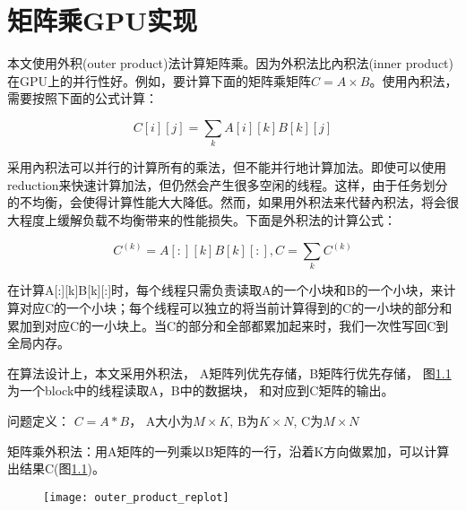 \chapter{矩阵乘GPU实现}\label{chap:GEMMGPU}

本文使用外积(outer product)法计算矩阵乘。因为外积法比內积法(inner product)在GPU上的并行性好。例如，要计算下面的矩阵乘矩阵$C=A \times B$。使用內积法，需要按照下面的公式计算：

\begin{equation}
\label{eq:innerproduct}
C[i][j]=\sum_{k}A[i][k]B[k][j]
\end{equation}

采用內积法可以并行的计算所有的乘法，但不能并行地计算加法。即使可以使用reduction来快速计算加法，但仍然会产生很多空闲的线程。这样，由于任务划分的不均衡，会使得计算性能大大降低。然而，如果用外积法来代替內积法，将会很大程度上缓解负载不均衡带来的性能损失。下面是外积法的计算公式：

\begin{equation}
\label{eq:outerproduct}
C^{(k)}=A[:][k]B[k][:], C=\sum_{k}C^{(k)}
\end{equation}

在计算A[:][k]B[k][:]时，每个线程只需负责读取A的一个小块和B的一个小块，来计算对应C的一个小块；每个线程可以独立的将当前计算得到的C的一小块的部分和累加到对应C的一小块上。当C的部分和全部都累加起来时，我们一次性写回C到全局内存。

在算法设计上，本文采用外积法， A矩阵列优先存储，B矩阵行优先存储， 图\ref{fig:outer_product_replot}为一个block中的线程读取A，B中的数据块， 和对应到C矩阵的输出。

问题定义： $C = A * B$， A大小为$M \times K$, B为$K \times N$, C为$M \times N$

矩阵乘外积法：用A矩阵的一列乘以B矩阵的一行，沿着K方向做累加，可以计算出结果C(图\ref{fig:outer_product_replot})。
\begin{figure}[htbp]
	\centering
	\texttt{[image: outer\_product\_replot]}
	\label{fig:outer_product_replot}
\end{figure}
